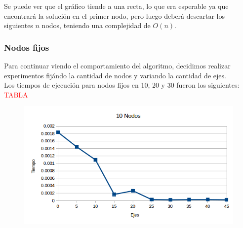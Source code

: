Se puede ver que el gr\'afico tiende a una recta, lo que era esperable ya que encontrar\'a la soluci\'on en el primer nodo, pero luego deber\'a descartar los siguientes $n$ nodos, teniendo una complejidad de $O(n)$.\\

\newpage

\subsubsection{Nodos fijos}
Para continuar viendo el comportamiento del algoritmo, decidimos realizar experimentos fij\'ando la cantidad de nodos y variando la cantidad de ejes.\\
Los tiempos de ejecuci\'on para nodos fijos en 10, 20 y 30 fueron los siguientes:\\
\textcolor{red}{TABLA}

  \begin{figure}[h!]
   \begin{center}
 	\includegraphics[scale=0.4]{imagenes/exacto/10Nodos.png}
	\label{10Nodos}
   \end{center}
 \end{figure}

